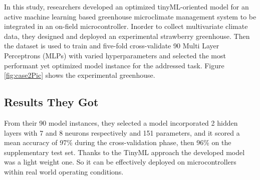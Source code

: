 \documentclass[../../main]{subfiles}
\begin{document}
In this study\cite{microclimate}, researchers developed an optimized tinyML-oriented
model for an active machine learning based greenhouse microclimate management system
to be integrated in an on-field microcontroller. Inorder to collect multivariate climate data,
they designed and deployed an experimental strawberry greenhouse.
Then the dataset is used to train and five-fold cross-validate 90 Multi Layer Perceptrons (MLPs)
with varied hyperparameters and selected the most performant yet optimized model instance for the addressed task.
Figure \ref{fig:case2Pic} shows the experimental greenhouse.

\subsection{Results They Got}

From their 90 model instances, they selected a model incorporated 2 hidden
layers with 7 and 8 neurons respectively and 151 parameters, and it scored a
mean accuracy of 97\% during the cross-validation phase, then 96\% on the
supplementary test set. Thanks to the TinyML approach the developed model
was a light weight one. So it can be effectively deployed on microcontrollers
within real world operating conditions.
\end{document}
